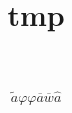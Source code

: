 
\title{tmp}
\usepackage{cancel}


\[
	\tilde{a}
	\varphi \varphi 
	\overline{a} \overline{w}
	\hat{a}
\]



